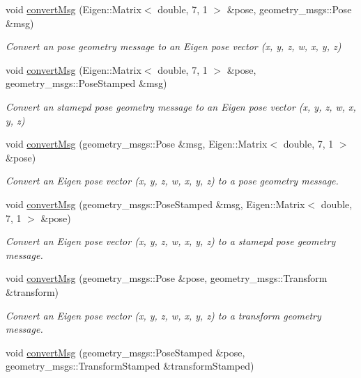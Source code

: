 \begin{DoxyCompactItemize}
void \hyperlink{group__multi__robot__controller_gafde5764b46f0189c2aea14ed57434708}{convert\+Msg} (Eigen\+::\+Matrix$<$ double, 7, 1 $>$ \&pose, geometry\+\_\+msgs\+::\+Pose \&msg)
\begin{DoxyCompactList}\small\item\em Convert an pose geometry message to an Eigen pose vector (x, y, z, w, x, y, z) \end{DoxyCompactList}\item 
void \hyperlink{group__multi__robot__controller_ga9e842115a5f448ab0e3ba9fea93d5179}{convert\+Msg} (Eigen\+::\+Matrix$<$ double, 7, 1 $>$ \&pose, geometry\+\_\+msgs\+::\+Pose\+Stamped \&msg)
\begin{DoxyCompactList}\small\item\em Convert an stamepd pose geometry message to an Eigen pose vector (x, y, z, w, x, y, z) \end{DoxyCompactList}\item 
void \hyperlink{group__multi__robot__controller_ga7beb50c98e49263d05b3b819be58d76c}{convert\+Msg} (geometry\+\_\+msgs\+::\+Pose \&msg, Eigen\+::\+Matrix$<$ double, 7, 1 $>$ \&pose)
\begin{DoxyCompactList}\small\item\em Convert an Eigen pose vector (x, y, z, w, x, y, z) to a pose geometry message. \end{DoxyCompactList}\item 
void \hyperlink{group__multi__robot__controller_gaf1628de186f2d90b064f8c8b36beef53}{convert\+Msg} (geometry\+\_\+msgs\+::\+Pose\+Stamped \&msg, Eigen\+::\+Matrix$<$ double, 7, 1 $>$ \&pose)
\begin{DoxyCompactList}\small\item\em Convert an Eigen pose vector (x, y, z, w, x, y, z) to a stamepd pose geometry message. \end{DoxyCompactList}\item 
void \hyperlink{group__multi__robot__controller_ga45b2bbef58d2c60ff8eeb77d221f2ab7}{convert\+Msg} (geometry\+\_\+msgs\+::\+Pose \&pose, geometry\+\_\+msgs\+::\+Transform \&transform)
\begin{DoxyCompactList}\small\item\em Convert an Eigen pose vector (x, y, z, w, x, y, z) to a transform geometry message. \end{DoxyCompactList}\item 
void \hyperlink{group__multi__robot__controller_gaf99f4d3d714176ee5a3d235ffabb7d3f}{convert\+Msg} (geometry\+\_\+msgs\+::\+Pose\+Stamped \&pose, geometry\+\_\+msgs\+::\+Transform\+Stamped \&transform\+Stamped)

\end{DoxyCompactItemize}

